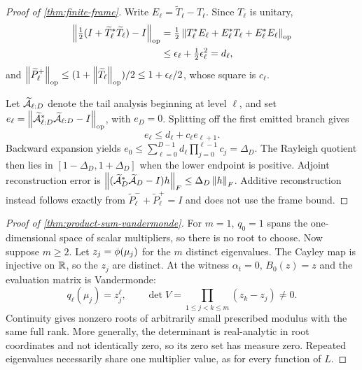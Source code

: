 \begin{proof}[Proof of \cref{thm:finite-frame}]
Write $E_\ell=\widetilde T_\ell-T_\ell$.  Since $T_\ell$ is unitary,
\begin{align}
 \left\|\tfrac12(I+\widetilde T_\ell^*\widetilde T_\ell)-I\right\|_{\mathrm{op}}
 &=\tfrac12\left\lVert T_\ell^*E_\ell+E_\ell^*T_\ell+E_\ell^*E_\ell\right\rVert_{\mathrm{op}}\\
 &\leq \epsilon_\ell+\tfrac12\epsilon_\ell^2=d_\ell,
\end{align}
and
$\left\lVert \widetilde P_\ell^+\right\rVert_{\mathrm{op}}
\leq(1+\left\lVert \widetilde T_\ell\right\rVert_{\mathrm{op}})/2
\leq1+\epsilon_\ell/2$, whose square is $c_\ell$.

Let $\widetilde{\mathcal A}_{\ell:D}$ denote the tail analysis beginning at level
$\ell$, and set
$e_\ell=\left\lVert \widetilde{\mathcal A}_{\ell:D}^*
\widetilde{\mathcal A}_{\ell:D}-I\right\rVert_{\mathrm{op}}$, with $e_D=0$.  Splitting off the first
emitted branch gives
\begin{equation}
 e_\ell\leq d_\ell+c_\ell e_{\ell+1}.
\end{equation}
Backward expansion yields
$e_0\leq\sum_{\ell=0}^{D-1}d_\ell\prod_{j=0}^{\ell-1}c_j=\Delta_D$.
The Rayleigh quotient then lies in $[1-\Delta_D,1+\Delta_D]$ when the lower
endpoint is positive.  Adjoint reconstruction error is
$\left\lVert (\widetilde{\mathcal A}_D^*\widetilde{\mathcal A}_D-I)h\right\rVert_F
\leq\Delta_D\left\lVert h\right\rVert_F$.  Additive reconstruction instead follows exactly
from $\widetilde P_\ell^-+\widetilde P_\ell^+=I$ and does not use the frame
bound.
\end{proof}

\begin{proof}[Proof of \cref{thm:product-sum-vandermonde}]
For $m=1$, $q_0=1$ spans the one-dimensional space of scalar multipliers, so
there is no root to choose.  Now suppose $m\geq2$.
Let $z_j=\phi(\mu_j)$ for the $m$ distinct eigenvalues.  The Cayley map is
injective on $\mathbb R$, so the $z_j$ are distinct.  At the witness
$\alpha_t=0$, $B_0(z)=z$ and the evaluation matrix is Vandermonde:
\begin{equation}
 q_\ell(\mu_j)=z_j^\ell,
 \qquad
 \det V=\prod_{1\leq j<k\leq m}(z_k-z_j)\neq0.
\end{equation}
Continuity gives nonzero roots of arbitrarily small prescribed modulus with
the same full rank.  More generally, the determinant is real-analytic in root
coordinates and not identically zero, so its zero set has measure zero.
Repeated eigenvalues necessarily share one multiplier value, as for every
function of $L$.
\end{proof}

